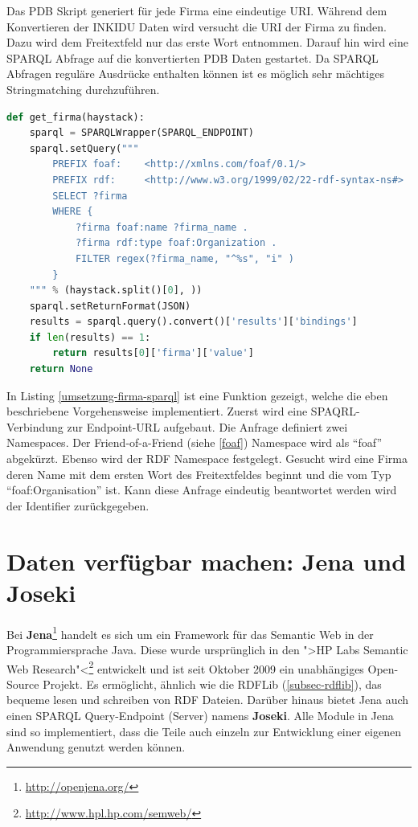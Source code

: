 Das PDB Skript generiert für jede Firma eine eindeutige URI.
Während dem Konvertieren der INKIDU Daten wird versucht die URI der Firma zu finden.
Dazu wird dem Freitextfeld nur das erste Wort entnommen.
Darauf hin wird eine SPARQL Abfrage auf die konvertierten PDB Daten gestartet.
Da SPARQL Abfragen reguläre Ausdrücke enthalten können ist es möglich sehr mächtiges Stringmatching durchzuführen.

\begin{lstlisting}[language=Python,caption=Funktion um mit Hilfe von SPARQL Firma zu finden,stepnumber=1,label=umsetzung-firma-sparql]
def get_firma(haystack):
	sparql = SPARQLWrapper(SPARQL_ENDPOINT)
	sparql.setQuery("""
		PREFIX foaf:    <http://xmlns.com/foaf/0.1/>
		PREFIX rdf:     <http://www.w3.org/1999/02/22-rdf-syntax-ns#>
		SELECT ?firma
		WHERE { 
			?firma foaf:name ?firma_name .
			?firma rdf:type foaf:Organization .
			FILTER regex(?firma_name, "^%s", "i" )
		}
	""" % (haystack.split()[0], ))
	sparql.setReturnFormat(JSON)
	results = sparql.query().convert()['results']['bindings']
	if len(results) == 1:
		return results[0]['firma']['value']
	return None
\end{lstlisting}

In Listing \ref{umsetzung-firma-sparql} ist eine Funktion gezeigt, welche die eben beschriebene Vorgehensweise implementiert.
Zuerst wird eine SPAQRL-Verbindung zur Endpoint-URL aufgebaut.
Die Anfrage definiert zwei Namespaces.
Der Friend-of-a-Friend (siehe \ref{foaf}) Namespace wird als ``foaf'' abgekürzt. Ebenso wird der RDF Namespace festgelegt.
Gesucht wird eine Firma deren Name mit dem ersten Wort des Freitextfeldes beginnt und die vom Typ ``foaf:Organisation'' ist.
Kann diese Anfrage eindeutig beantwortet werden wird der Identifier zurückgegeben.


\section{Daten verfügbar machen: Jena und Joseki} %
\label{sec-daten-joseki}
Bei \textbf{Jena}\footnote{\url{http://openjena.org/}} handelt es sich um ein Framework für das Semantic Web in der Programmiersprache Java. Diese wurde ursprünglich in den ">HP Labs Semantic Web Research"<\footnote{\url{http://www.hpl.hp.com/semweb/}} entwickelt und ist seit Oktober 2009 ein unabhängiges Open-Source Projekt. Es ermöglicht, ähnlich wie die RDFLib (\ref{subsec-rdflib}), das bequeme lesen und schreiben von RDF Dateien. Darüber hinaus bietet Jena auch einen SPARQL Query-Endpoint (Server) namens \textbf{Joseki}. Alle Module in Jena sind so implementiert, dass die Teile auch einzeln zur Entwicklung einer eigenen Anwendung genutzt werden können.

